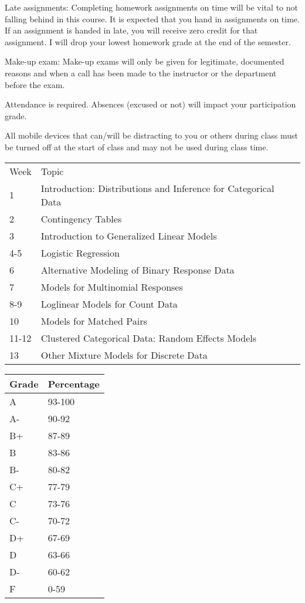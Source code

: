 \documentclass[10pt]{article}
\begin{document}
Late assignments: Completing homework assignments on time will be vital to not falling behind in this course. It is expected that you hand in assignments on time. If an assignment is handed in late, you will receive zero credit for that assignment. I will drop your lowest homework grade at the end of the semester.

Make-up exam: Make-up exams will only be given for legitimate, documented reasons and when a call has been made to the instructor or the department before the exam.

Attendance is required. Absences (excused or not) will impact your participation grade.

All mobile devices that can/will be distracting to you or others during class must be turned off at the start of class and may not be used during class time.
  
  {
\bigskip
{}
  \begin{table}[htp]
\begin{tabular}{ll}
Week & Topic \\
1 & Introduction: Distributions and Inference for Categorical Data \\
2 & Contingency Tables \\
3 & Introduction to Generalized Linear Models \\
4-5 &	Logistic Regression \\
6 & Alternative Modeling of Binary Response Data \\
7 & Models for Multinomial Responses \\
8-9 & Loglinear Models for Count Data \\
10 & Models for Matched Pairs \\
11-12 & Clustered Categorical Data: Random Effects Models \\
13 & Other Mixture Models for Discrete Data
\end{tabular}
\end{table}%
}

\clearpage
{ 
\bigskip
{}
\begin{table}[htp]
\begin{tabular}{ll}
Grade & Percentage \\
\hline
A & 93-100 \\
A- & 90-92 \\
B+ & 87-89 \\
B & 83-86 \\
B- & 80-82 \\
C+ & 77-79 \\
C & 73-76 \\
C- & 70-72 \\
D+ & 67-69 \\
D & 63-66 \\
D- & 60-62\\
F & 0-59 \\
\end{tabular}
\end{table}%
  }
  
\end{document}
